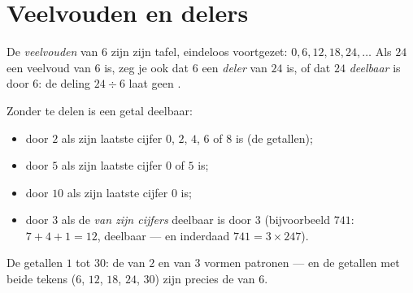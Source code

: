 \section{Veelvouden en delers}

\begin{definition}\label{def:g5:division:multiple}
De \emph{veelvouden} van $6$ zijn zijn tafel, eindeloos
voortgezet: $0, 6, 12, 18, 24, \dots$ Als $24$ een veelvoud van $6$ is, zeg
je ook dat $6$ een \emph{deler} van $24$ is, of dat $24$
\emph{deelbaar} is door $6$: de deling $24 \div 6$ laat geen .
\end{definition}

\begin{proposition}[Deelbaarheidsregels]\label{prop:g5:division:criteria}
Zonder te delen is een getal deelbaar:
\begin{itemize}
  \item door $2$ als zijn laatste cijfer $0$, $2$, $4$, $6$ of $8$ is (de
         getallen);
  \item door $5$ als zijn laatste cijfer $0$ of $5$ is;
  \item door $10$ als zijn laatste cijfer $0$ is;
  \item door $3$ als de \emph{ van zijn cijfers} deelbaar is door $3$
        (bijvoorbeeld $741$: $7 + 4 + 1 = 12$, deelbaar --- en inderdaad
        $741 = 3 \times 247$).
\end{itemize}
\end{proposition}
\admitted

\begin{omfigure}

{\small De getallen $1$ tot $30$: de  van $2$ en van $3$ vormen
patronen --- en de getallen met beide tekens ($6$, $12$, $18$, $24$, $30$)
zijn precies de  van $6$.}
\end{omfigure}

